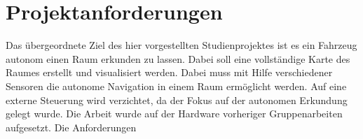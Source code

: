 

\chapter{Projektanforderungen}

Das übergeordnete Ziel des hier vorgestellten Studienprojektes ist es ein Fahrzeug autonom einen Raum erkunden zu lassen. Dabei soll eine vollständige Karte des Raumes erstellt und visualisiert werden. Dabei muss mit Hilfe verschiedener Sensoren die autonome Navigation in einem Raum ermöglicht werden. Auf eine externe Steuerung wird verzichtet, da der Fokus auf der autonomen Erkundung gelegt wurde.
Die Arbeit wurde auf der Hardware vorheriger Gruppenarbeiten aufgesetzt. Die Anforderungen 

